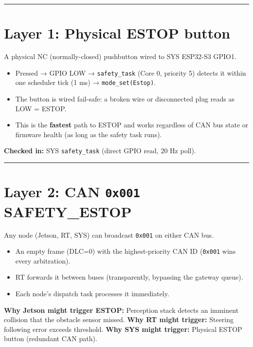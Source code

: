\documentclass[12pt,a4paper,oneside]{report}
\providecommand{\tightlist}{\setlength{\itemsep}{0pt}\setlength{\parskip}{0pt}}
\begin{document}
\begin{center}\rule{0.5\linewidth}{0.5pt}\end{center}

\section{Layer 1: Physical ESTOP button}\label{layer-1-physical-estop-button}

A physical NC (normally-closed) pushbutton wired to SYS ESP32-S3 GPIO1.

\begin{itemize}
\tightlist
\item
  Pressed → GPIO LOW → \texttt{safety\_task} (Core 0, priority 5) detects it
  within one scheduler tick (1 ms) → \texttt{mode\_set(Estop)}.
\item
  The button is wired fail-safe: a broken wire or disconnected plug reads as LOW
  = ESTOP.
\item
  This is the \textbf{fastest} path to ESTOP and works regardless of CAN bus
  state or firmware health (as long as the safety task runs).
\end{itemize}

\textbf{Checked in:} SYS \texttt{safety\_task} (direct GPIO read, 20 Hz poll).

\begin{center}\rule{0.5\linewidth}{0.5pt}\end{center}

\section{\texorpdfstring{Layer 2: CAN \texttt{0x001}
SAFETY\_ESTOP}{Layer 2: CAN 0x001 SAFETY\_ESTOP}}\label{layer-2-can-0x001-safety_estop}

Any node (Jetson, RT, SYS) can broadcast \texttt{0x001} on either CAN bus.

\begin{itemize}
\tightlist
\item
  An empty frame (DLC=0) with the highest-priority CAN ID (\texttt{0x001} wins
  every arbitration).
\item
  RT forwards it between buses (transparently, bypassing the gateway queue).
\item
  Each node's dispatch task processes it immediately.
\end{itemize}

\textbf{Why Jetson might trigger ESTOP:} Perception stack detects an imminent
collision that the obstacle sensor missed. \textbf{Why RT might trigger:}
Steering following error exceeds threshold. \textbf{Why SYS might trigger:}
Physical ESTOP button (redundant CAN path).
\end{document}

